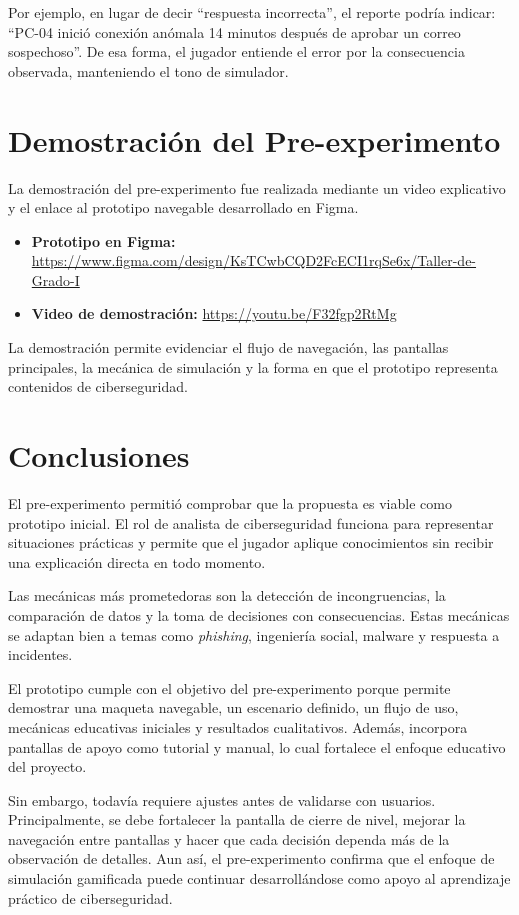 ﻿\documentclass[12pt]{article}
\begin{document}
Por ejemplo, en lugar de decir ``respuesta incorrecta'', el reporte podr\'{i}a indicar: ``PC-04 inici\'{o} conexi\'{o}n an\'{o}mala 14 minutos despu\'{e}s de aprobar un correo sospechoso''. De esa forma, el jugador entiende el error por la consecuencia observada, manteniendo el tono de simulador.

\section{Demostraci\'{o}n del Pre-experimento}

La demostraci\'{o}n del pre-experimento fue realizada mediante un video explicativo y el enlace al prototipo navegable desarrollado en Figma.

\begin{itemize}
    \item \textbf{Prototipo en Figma:} \url{https://www.figma.com/design/KsTCwbCQD2FcECI1rqSe6x/Taller-de-Grado-I}
    \item \textbf{Video de demostraci\'{o}n:} \url{https://youtu.be/F32fgp2RtMg}
\end{itemize}

La demostraci\'{o}n permite evidenciar el flujo de navegaci\'{o}n, las pantallas principales, la mec\'{a}nica de simulaci\'{o}n y la forma en que el prototipo representa contenidos de ciberseguridad.

\section{Conclusiones}

El pre-experimento permiti\'{o} comprobar que la propuesta es viable como prototipo inicial. El rol de analista de ciberseguridad funciona para representar situaciones pr\'{a}cticas y permite que el jugador aplique conocimientos sin recibir una explicaci\'{o}n directa en todo momento.

Las mec\'{a}nicas m\'{a}s prometedoras son la detecci\'{o}n de incongruencias, la comparaci\'{o}n de datos y la toma de decisiones con consecuencias. Estas mec\'{a}nicas se adaptan bien a temas como \textit{phishing}, ingenier\'{i}a social, malware y respuesta a incidentes.

El prototipo cumple con el objetivo del pre-experimento porque permite demostrar una maqueta navegable, un escenario definido, un flujo de uso, mec\'{a}nicas educativas iniciales y resultados cualitativos. Adem\'{a}s, incorpora pantallas de apoyo como tutorial y manual, lo cual fortalece el enfoque educativo del proyecto.

Sin embargo, todav\'{i}a requiere ajustes antes de validarse con usuarios. Principalmente, se debe fortalecer la pantalla de cierre de nivel, mejorar la navegaci\'{o}n entre pantallas y hacer que cada decisi\'{o}n dependa m\'{a}s de la observaci\'{o}n de detalles. Aun as\'{i}, el pre-experimento confirma que el enfoque de simulaci\'{o}n gamificada puede continuar desarroll\'{a}ndose como apoyo al aprendizaje pr\'{a}ctico de ciberseguridad.
\end{document}
